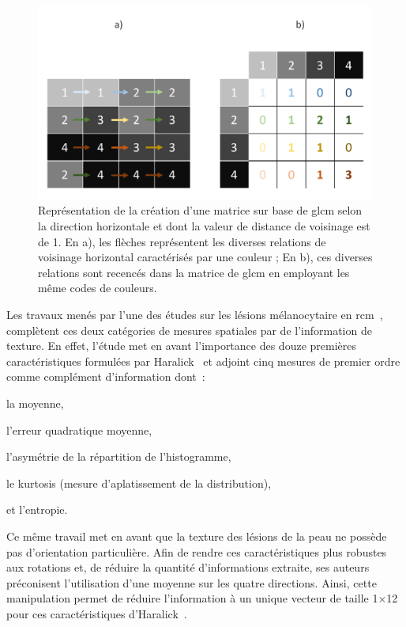 \begin{figure}[H]
    \centering
    \includegraphics[width=\linewidth]{contents/chapter_4/resources/scheme_principle_GLCM.pdf}
    \caption{Représentation de la création d'une matrice sur base de \gls{glcm} selon la direction horizontale et dont la valeur de distance de voisinage est de 1. En a), les flèches représentent les diverses relations de voisinage horizontal caractérisés par une couleur ; En b), ces diverses relations sont recencés dans la matrice de \gls{glcm} en employant les même codes de couleurs.}
    \label{fig:scheme_principle_GLCM}
\end{figure}\par

Les travaux menés par l'une des études sur les lésions mélanocytaire en \gls{rcm}~\cite{Wiltgen2008}, complètent ces deux catégories de mesures spatiales par de l'information de texture. En effet, l'étude met en avant l'importance des douze premières caractéristiques formulées par Haralick~\cite{Haralick1973} et adjoint cinq mesures de premier ordre comme complément d'information dont~:
\begin{inlinerate}
    \item la moyenne,
    \item l'erreur quadratique moyenne,
    \item l'asymétrie de la répartition de l'histogramme,
    \item le kurtosis (mesure d'aplatissement de la distribution),
    \item et l'entropie.
\end{inlinerate}
Ce même travail met en avant que la texture des lésions de la peau ne possède pas d'orientation particulière. Afin de rendre ces caractéristiques plus robustes aux rotations et, de réduire la quantité d'informations extraite, ses auteurs préconisent l'utilisation d'une moyenne sur les quatre directions. Ainsi, cette manipulation permet de réduire l'information à un unique vecteur de taille 1$\times$12 pour ces caractéristiques d'Haralick~\cite{Wiltgen2008}.\par

